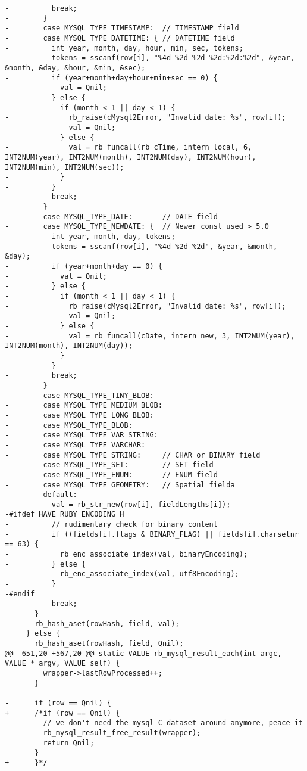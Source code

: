 \begin{lstlisting}
-          break;
-        }
-        case MYSQL_TYPE_TIMESTAMP:  // TIMESTAMP field
-        case MYSQL_TYPE_DATETIME: { // DATETIME field
-          int year, month, day, hour, min, sec, tokens;
-          tokens = sscanf(row[i], "%4d-%2d-%2d %2d:%2d:%2d", &year, &month, &day, &hour, &min, &sec);
-          if (year+month+day+hour+min+sec == 0) {
-            val = Qnil;
-          } else {
-            if (month < 1 || day < 1) {
-              rb_raise(cMysql2Error, "Invalid date: %s", row[i]);
-              val = Qnil;
-            } else {
-              val = rb_funcall(rb_cTime, intern_local, 6, INT2NUM(year), INT2NUM(month), INT2NUM(day), INT2NUM(hour), INT2NUM(min), INT2NUM(sec));
-            }
-          }
-          break;
-        }
-        case MYSQL_TYPE_DATE:       // DATE field
-        case MYSQL_TYPE_NEWDATE: {  // Newer const used > 5.0
-          int year, month, day, tokens;
-          tokens = sscanf(row[i], "%4d-%2d-%2d", &year, &month, &day);
-          if (year+month+day == 0) {
-            val = Qnil;
-          } else {
-            if (month < 1 || day < 1) {
-              rb_raise(cMysql2Error, "Invalid date: %s", row[i]);
-              val = Qnil;
-            } else {
-              val = rb_funcall(cDate, intern_new, 3, INT2NUM(year), INT2NUM(month), INT2NUM(day));
-            }
-          }
-          break;
-        }
-        case MYSQL_TYPE_TINY_BLOB:
-        case MYSQL_TYPE_MEDIUM_BLOB:
-        case MYSQL_TYPE_LONG_BLOB:
-        case MYSQL_TYPE_BLOB:
-        case MYSQL_TYPE_VAR_STRING:
-        case MYSQL_TYPE_VARCHAR:
-        case MYSQL_TYPE_STRING:     // CHAR or BINARY field
-        case MYSQL_TYPE_SET:        // SET field
-        case MYSQL_TYPE_ENUM:       // ENUM field
-        case MYSQL_TYPE_GEOMETRY:   // Spatial fielda
-        default:
-          val = rb_str_new(row[i], fieldLengths[i]);
-#ifdef HAVE_RUBY_ENCODING_H
-          // rudimentary check for binary content
-          if ((fields[i].flags & BINARY_FLAG) || fields[i].charsetnr == 63) {
-            rb_enc_associate_index(val, binaryEncoding);
-          } else {
-            rb_enc_associate_index(val, utf8Encoding);
-          }
-#endif
-          break;
-      }
       rb_hash_aset(rowHash, field, val);
     } else {
       rb_hash_aset(rowHash, field, Qnil);
@@ -651,20 +567,20 @@ static VALUE rb_mysql_result_each(int argc, VALUE * argv, VALUE self) {
         wrapper->lastRowProcessed++;
       }
 
-      if (row == Qnil) {
+      /*if (row == Qnil) {
         // we don't need the mysql C dataset around anymore, peace it
         rb_mysql_result_free_result(wrapper);
         return Qnil;
-      }
+      }*/
 

\end{lstlisting}
